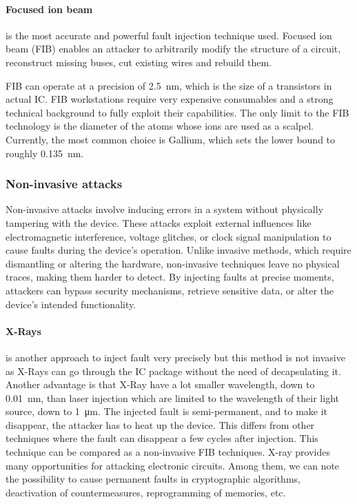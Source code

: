 \paragraph{Focused ion beam} is the most accurate and powerful fault injection technique used. Focused ion beam (FIB) enables an attacker to arbitrarily modify the structure of a circuit, reconstruct missing buses, cut existing wires and rebuild them.

FIB can operate at a precision of \SI{2.5}{\nano\metre}, which is the size of a transistors in actual IC. FIB workstations require very expensive consumables and a strong technical background to fully exploit their capabilities. The only limit to the FIB technology is the diameter of the atoms whose ions are used as a scalpel. Currently, the most common choice is Gallium, which sets the lower bound to roughly \SI{0.135}{\nano\metre}.

\cite{FVMBMWP-23-wfiot} 

\subsubsection{Non-invasive attacks}
Non-invasive attacks involve inducing errors in a system without physically tampering with the device. These attacks exploit external influences like electromagnetic interference, voltage glitches, or clock signal manipulation to cause faults during the device's operation. Unlike invasive methods, which require dismantling or altering the hardware, non-invasive techniques leave no physical traces, making them harder to detect. By injecting faults at precise moments, attackers can bypass security mechanisms, retrieve sensitive data, or alter the device's intended functionality.

\paragraph{X-Rays} is another approach to inject fault very precisely but this method is not invasive as X-Rays can go through the IC package without the need of decapsulating it. Another advantage is that X-Ray have a lot smaller wavelength, down to \SI{0.01}{\nano\meter}, than laser injection which are limited to the wavelength of their light source, down to \SI{1}{\micro\meter}.
The injected fault is semi-permanent, and to make it disappear, the attacker has to heat up the device. This differs from other techniques where the fault can disappear a few cycles after injection.
This technique can be compared as a non-invasive FIB techniques. X-ray provides many opportunities for attacking electronic circuits. Among them, we can note the possibility to cause permanent faults in cryptographic algorithms, deactivation of countermeasures, reprogramming of memories, etc.

